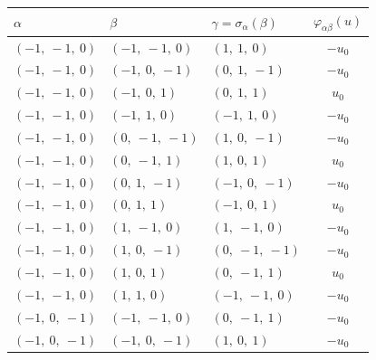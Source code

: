 \documentclass[11pt]{article}
\newcommand{\noi}{\noindent}
\theoremstyle{definition}
\begin{document}
\noi \noindent \begin{longtable}{|l|l|l|c|}
    \hline
    \textbf{$\alpha$} & \textbf{$\beta$} & \textbf{$\gamma = \sigma_{\alpha}(\beta)$} & $\varphi_{\alpha\beta}(u)$ \\
    \hline
    \endhead
    $\left( -1, \  -1, \  0\right)$ & $\left( -1, \  -1, \  0\right)$ & $\left( 1, \  1, \  0\right)$ & $- u_{0}$ \\
    \hline
    $\left( -1, \  -1, \  0\right)$ & $\left( -1, \  0, \  -1\right)$ & $\left( 0, \  1, \  -1\right)$ & $- u_{0}$ \\
    \hline
    $\left( -1, \  -1, \  0\right)$ & $\left( -1, \  0, \  1\right)$ & $\left( 0, \  1, \  1\right)$ & $u_{0}$ \\
    \hline
    $\left( -1, \  -1, \  0\right)$ & $\left( -1, \  1, \  0\right)$ & $\left( -1, \  1, \  0\right)$ & $- u_{0}$ \\
    \hline
    $\left( -1, \  -1, \  0\right)$ & $\left( 0, \  -1, \  -1\right)$ & $\left( 1, \  0, \  -1\right)$ & $- u_{0}$ \\
    \hline
    $\left( -1, \  -1, \  0\right)$ & $\left( 0, \  -1, \  1\right)$ & $\left( 1, \  0, \  1\right)$ & $u_{0}$ \\
    \hline
    $\left( -1, \  -1, \  0\right)$ & $\left( 0, \  1, \  -1\right)$ & $\left( -1, \  0, \  -1\right)$ & $- u_{0}$ \\
    \hline
    $\left( -1, \  -1, \  0\right)$ & $\left( 0, \  1, \  1\right)$ & $\left( -1, \  0, \  1\right)$ & $u_{0}$ \\
    \hline
    $\left( -1, \  -1, \  0\right)$ & $\left( 1, \  -1, \  0\right)$ & $\left( 1, \  -1, \  0\right)$ & $- u_{0}$ \\
    \hline
    $\left( -1, \  -1, \  0\right)$ & $\left( 1, \  0, \  -1\right)$ & $\left( 0, \  -1, \  -1\right)$ & $- u_{0}$ \\
    \hline
    $\left( -1, \  -1, \  0\right)$ & $\left( 1, \  0, \  1\right)$ & $\left( 0, \  -1, \  1\right)$ & $u_{0}$ \\
    \hline
    $\left( -1, \  -1, \  0\right)$ & $\left( 1, \  1, \  0\right)$ & $\left( -1, \  -1, \  0\right)$ & $- u_{0}$ \\
    \hline
    $\left( -1, \  0, \  -1\right)$ & $\left( -1, \  -1, \  0\right)$ & $\left( 0, \  -1, \  1\right)$ & $- u_{0}$ \\
    \hline
    $\left( -1, \  0, \  -1\right)$ & $\left( -1, \  0, \  -1\right)$ & $\left( 1, \  0, \  1\right)$ & $- u_{0}$ \\

\end{longtable}
\end{document}
